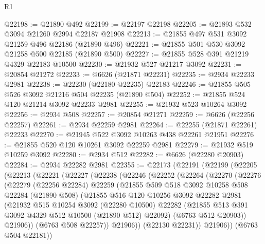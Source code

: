 \begin{lexlean}{R1}
\begin{coremodule}
@22198 := @21890 @492
@22199 := @22197 @22198
@22205 := @21893 @532 @3094 @21260 @2994 @22187 @21908
@22213 := @21855 @497 @531 @3092 @21259 @496 @22186 (@21890 @496)
@22221 := @21855 @501 @530 @3092 @21258 @500 @22185 (@21890 @500)
@22227 := @21855 @528 @391 @21219 @4329 @22183 @10500
@22230 := @21932 @527 @21217 @3092
@22231 := @20854 @21272
@22233 := @6626 (@21871 @22231)
@22235 := @2934 @22233 @2981
@22238 := @22230 (@22180 @22235) @22183
@22246 := @21855 @505 @526 @3092 @21216 @504 @22235 (@21890 @504)
@22252 := @21855 @524 @120 @21214 @3092 @22233 @2981
@22255 := @21932 @523 @10264 @3092
@22256 := @2934 @508
@22257 := @20854 @21271
@22259 := @6626 (@22256 @22257)
@22261 := @2934 @22259 @2981
@22264 := @22255 (@21871 @22261) @22233
@22270 := @21945 @522 @3092 @10263 @438 @22261 @21951
@22276 := @21855 @520 @120 @10261 @3092 @22259 @2981
@22279 := @21932 @519 @10259 @3092
@22280 := @2934 @512
@22282 := @6626 (@22280 @20903)
@22284 := @2934 @22282 @2981
@22355 := @22173
    (@22191
      (@22199
        (@22205
          (@22213
            (@22221
              (@22227
                (@22238
                  (@22246
                    (@22252
                      (@22264
                        (@22270
                          (@22276
                            (@22279
                              (@22256 @22284)
                              @22259
                              (@21855
                                @509
                                @518
                                @3092
                                @10258
                                @508
                                @22284
                                (@21890 @508)
                                (@21855
                                  @516
                                  @120
                                  @10256
                                  @3092
                                  @22282
                                  @2981
                                  (@21932
                                    @515
                                    @10254
                                    @3092
                                    (@22280 @10500)
                                    @22282
                                    (@21855 @513 @391 @3092 @4329 @512 @10500 (@21890 @512) @22092)
                                    (@6763 @512 @20903))
                                  @21906))
                              (@6763 @508 @22257))
                            @21906))
                        (@22130 @22231))
                      @21906))
                  (@6763 @504 @22181))

\end{coremodule}
\end{lexlean}
